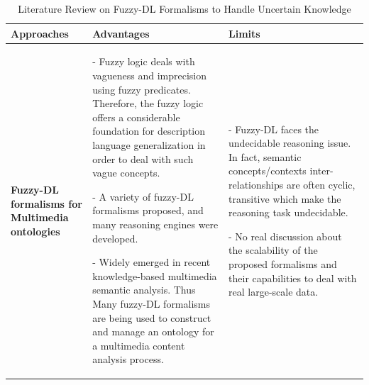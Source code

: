 		\begin{table}
			\footnotesize
			\centering
			\caption{Literature Review on Fuzzy-DL Formalisms to Handle Uncertain Knowledge}
			\begin{tabular}{p{4.7cm}  p{4.7cm}p{4.7cm}}
				\textbf{\sffamily Approaches} & \textbf{\sffamily Advantages} & \textbf{\sffamily Limits} \\  \hline
				\begin{flushleft} {\textbf{Fuzzy-DL formalisms for Multimedia ontologies}} \end{flushleft}
				& \begin{flushleft}
					- Fuzzy logic deals with vagueness and imprecision using fuzzy predicates. 
					Therefore, the fuzzy logic offers a considerable foundation 
					for description language generalization in order to deal with such vague concepts. \par
					- A variety of fuzzy-DL formalisms \revAnglais{is} proposed, and many reasoning engines 
					were developed.\par
					- Widely emerged in recent knowledge-based multimedia semantic analysis. 
					Thus Many fuzzy-DL formalisms are being used to construct and 
					manage an ontology for a multimedia content analysis process.
				 \end{flushleft}
				& \begin{flushleft} 
					- Fuzzy-DL faces the undecidable reasoning issue. 
					In fact, semantic concepts/contexts inter-relationships are 
					often cyclic, transitive which make the reasoning task 
					undecidable.\par
					 - No real discussion about the scalability of the proposed formalisms
					and their capabilities to deal with real large-scale data. \par
				  \end{flushleft} \\
				\hline
			\end{tabular}
			\label{review2}
		\end{table}
 
